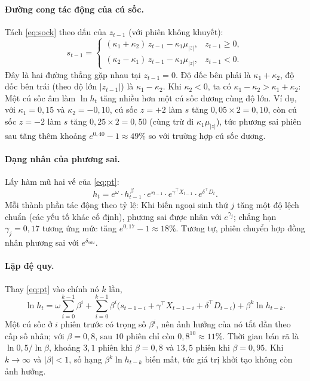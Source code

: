 \documentclass[12pt,a4paper]{article}
\theoremstyle{definition}
\theoremstyle{remark}
\begin{document}
\paragraph{Đường cong tác động của cú sốc.} Tách \eqref{eq:sock} theo dấu của $z_{t-1}$ (với phiên không khuyết):
\begin{equation}\label{eq:nic}
s_{t-1}=\begin{cases}
(\kappa_1+\kappa_2)\,z_{t-1}-\kappa_1\mu_{|z|}, & z_{t-1}\ge0,\\[4pt]
(\kappa_2-\kappa_1)\,z_{t-1}-\kappa_1\mu_{|z|}, & z_{t-1}<0 .
\end{cases}
\end{equation}
Đây là hai đường thẳng gặp nhau tại $z_{t-1}=0$. Độ dốc bên phải là $\kappa_1+\kappa_2$, độ dốc bên trái (theo độ lớn $|z_{t-1}|$) là $\kappa_1-\kappa_2$. Khi $\kappa_2<0$, ta có $\kappa_1-\kappa_2>\kappa_1+\kappa_2$: Một cú sốc âm làm $\ln h_t$ tăng nhiều hơn một cú sốc dương cùng độ lớn. Ví dụ, với $\kappa_1=0{,}15$ và $\kappa_2=-0{,}10$, cú sốc $z=+2$ làm $s$ tăng $0{,}05\times2=0{,}10$, còn cú sốc $z=-2$ làm $s$ tăng $0{,}25\times2=0{,}50$ (cùng trừ đi $\kappa_1\mu_{|z|}$), tức phương sai phiên sau tăng thêm khoảng $e^{0{,}40}-1\approx49\%$ so với trường hợp cú sốc dương.

\paragraph{Dạng nhân của phương sai.} Lấy hàm mũ hai vế của \eqref{eq:pt}:
\begin{equation}\label{eq:nhan}
h_t=e^{\omega}\cdot h_{t-1}^{\,\beta}\cdot e^{s_{t-1}}\cdot e^{\gamma^\top X_{t-1}}\cdot e^{\delta^\top D_t}.
\end{equation}
Mỗi thành phần tác động theo tỷ lệ: Khi biến ngoại sinh thứ $j$ tăng một độ lệch chuẩn (các yếu tố khác cố định), phương sai được nhân với $e^{\gamma_j}$; chẳng hạn $\gamma_j=0{,}17$ tương ứng mức tăng $e^{0{,}17}-1\approx18\%$. Tương tự, phiên chuyển hợp đồng nhân phương sai với $e^{\delta_{sau}}$.

\paragraph{Lặp đệ quy.} Thay \eqref{eq:pt} vào chính nó $k$ lần,
\begin{equation*}
\ln h_t=\omega\sum_{i=0}^{k-1}\beta^{i}+\sum_{i=0}^{k-1}\beta^{i}\big(s_{t-1-i}+\gamma^\top X_{t-1-i}+\delta^\top D_{t-i}\big)+\beta^{k}\ln h_{t-k}.
\end{equation*}
Một cú sốc ở $i$ phiên trước có trọng số $\beta^{i}$, nên ảnh hưởng của nó tắt dần theo cấp số nhân; với $\beta=0{,}8$, sau $10$ phiên chỉ còn $0{,}8^{10}\approx11\%$. Thời gian bán rã là $\ln0{,}5/\ln\beta$, khoảng $3{,}1$ phiên khi $\beta=0{,}8$ và $13{,}5$ phiên khi $\beta=0{,}95$. Khi $k\to\infty$ và $|\beta|<1$, số hạng $\beta^k\ln h_{t-k}$ biến mất, tức giá trị khởi tạo không còn ảnh hưởng.
\end{document}
